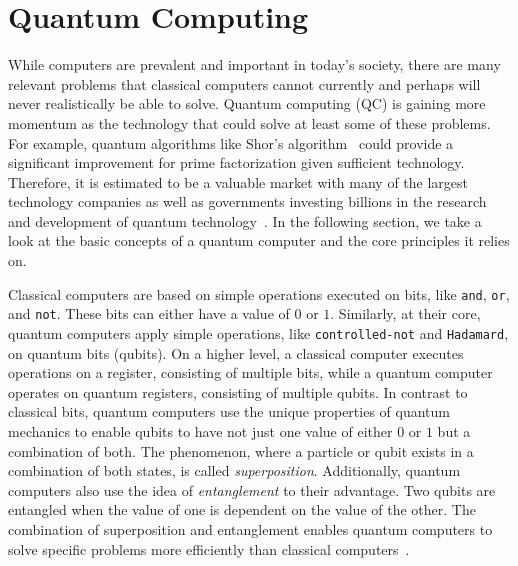 \section{Quantum Computing}
\label{sec:background_quantumComputing}
While computers are prevalent and important in today's society, there are many relevant problems that classical computers cannot currently and perhaps will never realistically be able to solve. Quantum computing (QC) is gaining more momentum as the technology that could solve at least some of these problems. For example, quantum algorithms like Shor's algorithm~\cite{Shor97} could provide a significant improvement for prime factorization given sufficient technology. Therefore, it is estimated to be a valuable market with many of the largest technology companies as well as governments investing billions in the research and development of quantum technology~\cite{RDB*22, Pres18}. 
In the following section, we take a look at the basic concepts of a quantum computer and the core principles it relies on.

Classical computers are based on simple operations executed on bits, like \texttt{and}, \texttt{or}, and \texttt{not}. These bits can either have a value of $0$ or $1$. Similarly, at their core, quantum computers apply simple operations, like \texttt{controlled-not} and \texttt{Hadamard}, on quantum bits (qubits). 
On a higher level, a classical computer executes operations on a register, consisting of multiple bits, while a quantum computer operates on quantum registers, consisting of multiple qubits.
In contrast to classical bits, quantum computers use the unique properties of quantum mechanics to enable qubits to have not just one value of either $0$ or $1$ but a combination of both. The phenomenon, where a particle or qubit exists in a combination of both states, is called \emph{superposition}. Additionally, quantum computers also use the idea of \emph{entanglement} to their advantage. Two qubits are entangled when the value of one is dependent on the value of the other. The combination of superposition and entanglement enables quantum computers to solve specific problems more efficiently than classical computers~\cite{RDB*22}.

